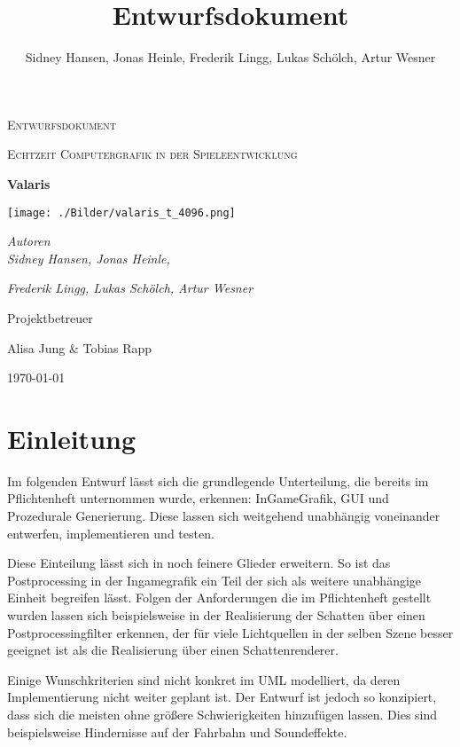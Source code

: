 \documentclass[parskip=full]{scrartcl}
\title{Entwurfsdokument}
\author{Sidney Hansen, Jonas Heinle, Frederik Lingg, Lukas Schölch, Artur Wesner}
\newcommand{\codename}{Valaris}
\begin{document}
	\begin{titlepage}
		\centering
		{\scshape\LARGE Entwurfsdokument\par}
		\vspace{1cm}
		{\scshape\Large Echtzeit Computergrafik in der Spieleentwicklung \par}
		\vspace{1cm}
		{\huge\bfseries \codename \par}
		\vspace{1cm}
		\texttt{[image: ./Bilder/valaris\_t\_4096.png]}
		\par
		{\vspace{1cm}}
		{\Large\itshape Autoren \\}
		{\Large\itshape Sidney Hansen, Jonas Heinle,\\}
		{\Large\itshape Frederik Lingg, Lukas Schölch, Artur Wesner\par}
		
		\vfill
		Projektbetreuer\par
		Alisa Jung \& Tobias Rapp
		
		\vfill
		
		{\large \today\par}
	\end{titlepage}

	\tableofcontents 
	\pagebreak
	
	
	\pagebreak
	
	\section{Einleitung}
	Im folgenden Entwurf lässt sich die grundlegende Unterteilung, die bereits im Pflichtenheft unternommen
	wurde, erkennen: InGameGrafik, GUI und Prozedurale Generierung. Diese lassen sich weitgehend unabhängig voneinander
	entwerfen, implementieren und testen.\par

	Diese Einteilung lässt sich in noch feinere Glieder erweitern. So ist das Postprocessing 
	in der Ingamegrafik ein Teil der sich als weitere unabhängige Einheit begreifen lässt. Folgen der Anforderungen
	die im Pflichtenheft gestellt wurden lassen sich beispielsweise in der Realisierung der Schatten über einen 
	Postprocessingfilter erkennen, der für viele Lichtquellen in der selben Szene besser geeignet ist als die 
	Realisierung über einen Schattenrenderer.\par


	Einige Wunschkriterien sind nicht konkret im UML modelliert, da deren Implementierung nicht weiter geplant ist.
	Der Entwurf ist jedoch so konzipiert, dass sich die meisten ohne größere Schwierigkeiten hinzufügen lassen.
	Dies sind beispielsweise Hindernisse auf der Fahrbahn und Soundeffekte.
\end{document}
